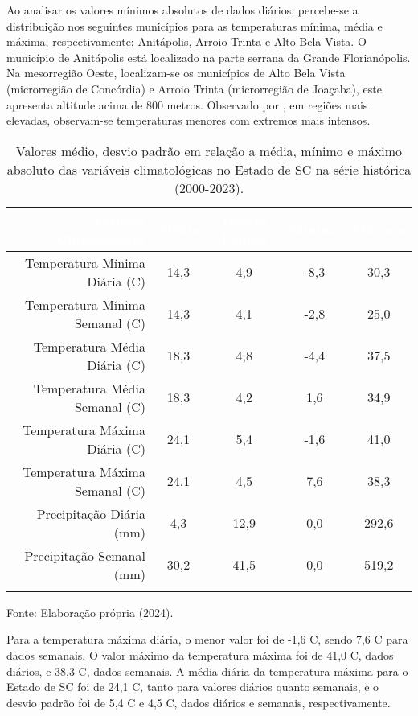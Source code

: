 \indent Ao analisar os valores mínimos absolutos de dados diários, percebe-se a distribuição nos seguintes municípios para as temperaturas mínima, média e máxima, respectivamente: Anitápolis, Arroio Trinta e Alto Bela Vista. O município de Anitápolis está localizado na parte serrana da Grande Florianópolis. Na mesorregião Oeste, localizam-se os municípios de Alto Bela Vista (microrregião de Concórdia) e Arroio Trinta (microrregião de Joaçaba), este apresenta altitude acima de 800 metros. Observado por , em regiões mais elevadas, observam-se temperaturas menores com extremos mais intensos.

\begin{table}[htbp]
    \begin{center}
    \caption{Valores médio, desvio padrão em relação a média, mínimo e máximo absoluto das variáveis climatológicas no Estado de \acrlong{SC} na série histórica (2000-2023).}
    {
    \begin{tabular}{r|cccc}
    \hline
    \toprule
    \rowcolor{darkgray} \textcolor{white}{Variável Climatológica} & \textcolor{white}{Média} & \textcolor{white}{Desvio Padrão} & \textcolor{white}{Mínima} & \textcolor{white}{Máxima}\\
    \midrule
    Temperatura Mínima Diária (C) & 14,3 & 4,9 & -8,3 & 30,3\\
    Temperatura Mínima Semanal (C) & 14,3 & 4,1 & -2,8 & 25,0\\
    Temperatura Média Diária (C) & 18,3 & 4,8 & -4,4 & 37,5\\
    Temperatura Média Semanal (C) & 18,3 & 4,2 & 1,6 & 34,9\\
    Temperatura Máxima Diária (C) & 24,1 & 5,4 & -1,6 & 41,0\\
    Temperatura Máxima Semanal (C) & 24,1 & 4,5 & 7,6 & 38,3\\ 
    Precipitação Diária (mm) & 4,3 & 12,9 & 0,0 & 292,6\\
    Precipitação Semanal (mm) & 30,2 & 41,5 & 0,0 & 519,2\\
    \bottomrule
    \label{tab:valores_climato}
    \end{tabular}}
    \end{center}

    \small{Fonte: Elaboração própria (2024).}
\end{table}

\indent Para a temperatura máxima diária, o menor valor foi de -1,6 C, sendo 7,6 C para dados semanais. O valor máximo da temperatura máxima foi de 41,0 C, dados diários, e 38,3 C, dados semanais. A média diária da temperatura máxima para o Estado de \acrlong{SC} foi de 24,1 C, tanto para valores diários quanto semanais, e o desvio padrão foi de 5,4 C e 4,5 C, dados diários e semanais, respectivamente.

